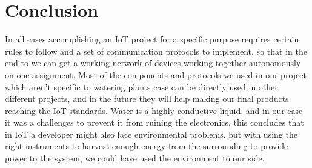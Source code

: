 \documentclass[11pt,paper=a4,parskip=half]{scrartcl}
\begin{document}
\section{Conclusion}

In all cases accomplishing an IoT project for a specific purpose requires
certain rules to follow and a set of communication protocols to implement, so
that in the end to we can get a working network of devices working together
autonomously on one assignment. Most of the components and protocols we used in
our project which aren't specific to watering plants case can be directly used
in other different projects, and in the future they will help making our final
products reaching the IoT standards. Water is a highly conductive liquid, and
in our case it was a challenges to prevent it from ruining the electronics,
this concludes that in IoT a developer might also face environmental problems,
but with using the right instruments to harvest enough energy from the
surrounding to provide power to the system, we could have used the environment
to our side.

\newpage
\nocite{*}


\end{document}
